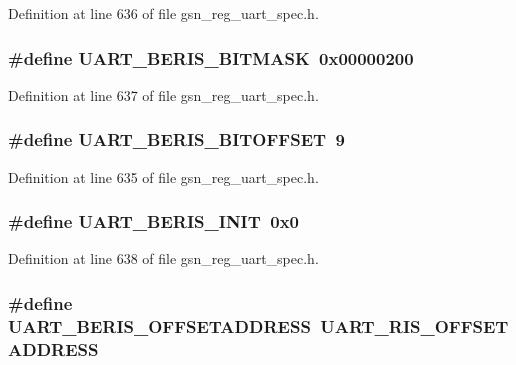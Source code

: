 Definition at line 636 of file gsn\_\-reg\_\-uart\_\-spec.h.

\hypertarget{a00575_a0e8ab3c4743abaddf94b427081f85bd1}{
\subsubsection[{UART\_\-BERIS\_\-BITMASK}]{\setlength{\rightskip}{0pt plus 5cm}\#define UART\_\-BERIS\_\-BITMASK~0x00000200}}
\label{a00575_a0e8ab3c4743abaddf94b427081f85bd1}


Definition at line 637 of file gsn\_\-reg\_\-uart\_\-spec.h.

\hypertarget{a00575_ab3e8c422f42983e876521c868df613ea}{
\subsubsection[{UART\_\-BERIS\_\-BITOFFSET}]{\setlength{\rightskip}{0pt plus 5cm}\#define UART\_\-BERIS\_\-BITOFFSET~9}}
\label{a00575_ab3e8c422f42983e876521c868df613ea}


Definition at line 635 of file gsn\_\-reg\_\-uart\_\-spec.h.

\hypertarget{a00575_a114b9491630497e0f5a7f64b7e13b2d5}{
\subsubsection[{UART\_\-BERIS\_\-INIT}]{\setlength{\rightskip}{0pt plus 5cm}\#define UART\_\-BERIS\_\-INIT~0x0}}
\label{a00575_a114b9491630497e0f5a7f64b7e13b2d5}


Definition at line 638 of file gsn\_\-reg\_\-uart\_\-spec.h.

\hypertarget{a00575_a855e52c5715a4708e44f3885c31cbe7d}{
\subsubsection[{UART\_\-BERIS\_\-OFFSETADDRESS}]{\setlength{\rightskip}{0pt plus 5cm}\#define UART\_\-BERIS\_\-OFFSETADDRESS~UART\_\-RIS\_\-OFFSETADDRESS}}
\label{a00575_a855e52c5715a4708e44f3885c31cbe7d}


